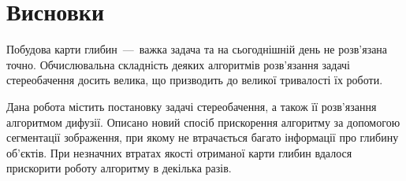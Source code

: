\chapter*{Висновки}

Побудова карти глибин~---~важка задача та
на сьогоднішній день не розв'язана точно.
Обчислювальна складність деяких алгоритмів розв'язання задачі стереобачення
досить велика, що призводить до великої тривалості їх роботи.

Дана робота містить постановку задачі стереобачення,
а також її розв'язання алгоритмом дифузії.
Описано новий спосіб прискорення алгоритму за допомогою сегментації зображення,
при якому не втрачається багато інформації про глибину об'єктів.
При незначних втратах якості отриманої карти глибин вдалося прискорити
роботу алгоритму в декілька разів.
